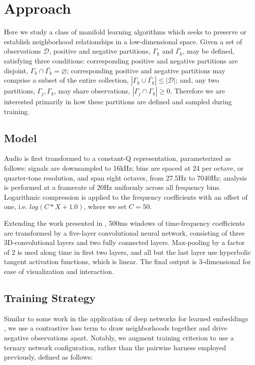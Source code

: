 \documentclass{article}
\begin{document}
\section{Approach}

Here we study a class of manifold learning algorithms which seeks to preserve or establish neighborhood relationships in a low-dimensional space.
Given a set of observations $\mathcal{D}$, positive and negative partitions, $\Gamma_k$ and $\bar{\Gamma_k}$, may be defined, satisfying three conditions:
corresponding positive and negative partitions are disjoint, $\Gamma_k \cap \bar{\Gamma_k} = \varnothing$;
corresponding positive and negative partitions may comprise a subset of the entire collection, $|\Gamma_k \cup \bar{\Gamma_k}| \le |\mathcal{D}|$;
and, any two partitions, $\Gamma_j, \Gamma_k$, may share observations, $|\Gamma_j \cap \Gamma_k| \ge 0$.
Therefore we are interested primarily in how these partitions are defined and sampled during training.


\subsection{Model}

Audio is first transformed to a constant-Q representation, parameterized as follows:
signals are downsampled to 16kHz;
bins are spaced at 24 per octave, or quarter-tone resolution, and span eight octaves, from 27.5Hz to 7040Hz;
analysis is performed at a framerate of 20Hz uniformly across all frequency bins.
Logarithmic compression is applied to the frequency coefficients with an offset of one, i.e. $log(C*X + 1.0)$, where we set $C=50$.

Extending the work presented in \cite{Humphrey2015dl4mir}, 500ms windows of time-frequency coefficients are transformed by a five-layer convolutional neural network, consisting of three 3D-convolutional layers and two fully connected layers.
Max-pooling by a factor of 2 is used along time in first two layers, and all but the last layer use hyperbolic tangent activation functions, which is linear.
The final output is 3-dimensional for ease of visualization and interaction.


\subsection{Training Strategy}

Similar to some work in the application of deep networks for learned embeddings \cite{hadsell2006drlim, humphrey2011nlse, humphrey2015dl4mir}, we use a contrastive loss term to draw neighborhoods together and drive negative observations apart.
Notably, we augment training criterion to use a ternary network configuration, rather than the pairwise harness employed previously, defined as follows:
\end{document}
